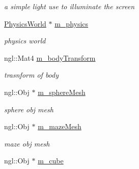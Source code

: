 \begin{DoxyCompactItemize}
\begin{DoxyCompactList}\small\item\em a simple light use to illuminate the screen \item\end{DoxyCompactList}\item 
\hypertarget{classNGLDraw_acc363ef7c9a437c97920f6e117b763f1}{
\hyperlink{classPhysicsWorld}{PhysicsWorld} $\ast$ \hyperlink{classNGLDraw_acc363ef7c9a437c97920f6e117b763f1}{m\_\-physics}}
\label{classNGLDraw_acc363ef7c9a437c97920f6e117b763f1}

\begin{DoxyCompactList}\small\item\em physics world \item\end{DoxyCompactList}\item 
\hypertarget{classNGLDraw_a6c10720ed7392b885059ba5d06cc0fc8}{
ngl::Mat4 \hyperlink{classNGLDraw_a6c10720ed7392b885059ba5d06cc0fc8}{m\_\-bodyTransform}}
\label{classNGLDraw_a6c10720ed7392b885059ba5d06cc0fc8}

\begin{DoxyCompactList}\small\item\em trasnform of body \item\end{DoxyCompactList}\item 
\hypertarget{classNGLDraw_a1e2de1a64477ee5b95723347a093ed89}{
ngl::Obj $\ast$ \hyperlink{classNGLDraw_a1e2de1a64477ee5b95723347a093ed89}{m\_\-sphereMesh}}
\label{classNGLDraw_a1e2de1a64477ee5b95723347a093ed89}

\begin{DoxyCompactList}\small\item\em sphere obj mesh \item\end{DoxyCompactList}\item 
\hypertarget{classNGLDraw_ac81ef39689766fabec9b85db89e48de6}{
ngl::Obj $\ast$ \hyperlink{classNGLDraw_ac81ef39689766fabec9b85db89e48de6}{m\_\-mazeMesh}}
\label{classNGLDraw_ac81ef39689766fabec9b85db89e48de6}

\begin{DoxyCompactList}\small\item\em maze obj mesh \item\end{DoxyCompactList}\item 
\hypertarget{classNGLDraw_ac2b121504241872fb886fbd38f238ddd}{
ngl::Obj $\ast$ \hyperlink{classNGLDraw_ac2b121504241872fb886fbd38f238ddd}{m\_\-cube}}
\label{classNGLDraw_ac2b121504241872fb886fbd38f238ddd}


\end{DoxyCompactItemize}
